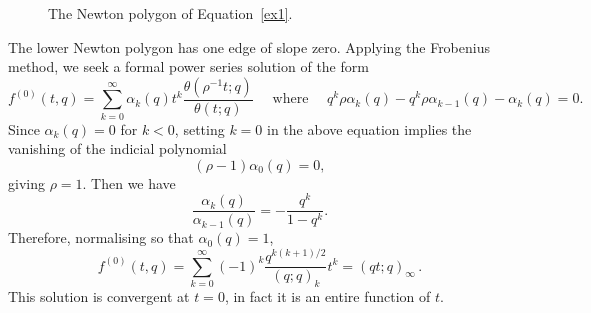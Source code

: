 \documentclass[12pt,reqno]{amsart}
\theoremstyle{definition}
\def\be{\begin{equation}}
\def\ee{\end{equation}}
\def\rind{\rho}
\begin{document}
\begin{figure}[!htpb]
\begin{center}
\caption{The Newton polygon of Equation~\eqref{ex1}.}
\label{f.ex1}
\end{center}
\end{figure}

\noindent
The lower Newton polygon has one edge of slope zero. Applying the
Frobenius method, we seek a formal power series solution of the form
\be
f^{(0)}(t,q)
=
\sum_{k=0}^{\infty}\alpha_{k}(q)t^{k}\frac{\theta(\rind^{-1}t;q)}{\theta(t;q)}
\quad\text{ where }\quad
q^{k}\rind\alpha_{k}(q)-q^{k}\rind\alpha_{k-1}(q)-\alpha_{k}(q)=0.
\ee
Since $\alpha_{k}(q)=0$ for $k<0$, setting $k=0$ in the above equation
implies the vanishing of the indicial polynomial
\be
(\rind-1)\alpha_{0}(q)=0,
\ee
giving $\rind=1$. Then we have
\be
\frac{\alpha_{k}(q)}{\alpha_{k-1}(q)}
=
-\frac{q^{k}}{1-q^{k}}.
\ee
Therefore, normalising so that $\alpha_{0}(q)=1$,
\be
\label{ex1.f0}
f^{(0)}(t,q)
=
\sum_{k=0}^{\infty}(-1)^{k}\frac{q^{k(k+1)/2}}{(q;q)_{k}}t^{k}
=
(qt;q)_{\infty} \,.
\ee
This solution is convergent at $t=0$, in fact it is an entire function of $t$.
\end{document}
